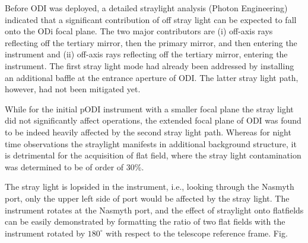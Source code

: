 \documentclass[]{spieman}
\begin{document}
Before ODI was deployed, a detailed straylight analysis (Photon Engineering)
indicated that a significant contribution of off stray light can be expected
to fall onto the ODi focal plane. The two major contributors are (i)
off-axis rays reflecting off the tertiary mirror, then the primary mirror,
and then entering the instrument and (ii) off-axis rays reflecting off the
tertiary mirror, entering the instrument. The first stray light mode had
already been addressed by installing an additional baffle at the entrance
aperture of ODI. The latter stray light path, however, had not been
mitigated yet.

While for the initial pODI instrument with a smaller focal plane the stray
light did not significantly affect operations, the extended focal plane of
ODI was found to be indeed heavily affected by the second stray light path.
Whereas for night time observations the straylight manifests in additional
background structure, it is detrimental for the acquisition of flat field,
where the stray light contamination was determined to be of order of 30\%.

The stray light is lopsided in the instrument, i.e., looking through the
Nasmyth port, only the upper left side of port would be affected by the
stray light. The instrument rotates at the Nasmyth port, and the effect of
straylight onto flatfields can be easily demonstrated by formatting the ratio
of two flat fields with the instrument rotated by $180^\circ$ with respect
to the telescope reference frame. Fig. \label{fig_flatfieldbaffle}
\end{document}
